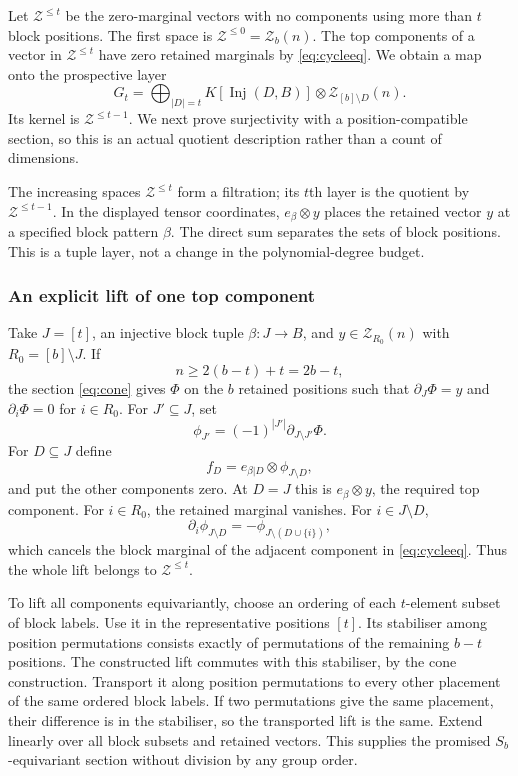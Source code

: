 \documentclass[11pt,a4paper]{article}
\theoremstyle{definition}\newtheorem{definition}[theorem]{Definition}
\theoremstyle{remark}\newtheorem{remark}[theorem]{Remark}
\DeclareMathOperator{\Inj}{Inj}
\begin{document}
Let $\mathcal Z^{\le t}$ be the zero-marginal vectors with no components using more than $t$ block positions. The first space is $\mathcal Z^{\le0}=\mathcal Z_b(n)$. The top components of a vector in $\mathcal Z^{\le t}$ have zero retained marginals by \eqref{eq:cycleeq}. We obtain a map onto the prospective layer
\[G_t=\bigoplus_{|D|=t}K[\Inj(D,B)]\otimes \mathcal Z_{[b]\setminus D}(n).
\]
Its kernel is $\mathcal Z^{\le t-1}$. We next prove surjectivity with a position-compatible section, so this is an actual quotient description rather than a count of dimensions.

The increasing spaces $\mathcal Z^{\le t}$ form a filtration; its
$t$th layer is the quotient by $\mathcal Z^{\le t-1}$. In the
displayed tensor coordinates, $e_\beta\otimes y$ places the retained
vector $y$ at a specified block pattern $\beta$. The direct sum separates
the sets of block positions. This is a tuple layer, not a change in
the polynomial-degree budget.

\subsubsection{An explicit lift of one top component}
Take $J=[t]$, an injective block tuple $\beta:J\to B$, and $y\in \mathcal Z_{R_0}(n)$ with $R_0=[b]\setminus J$. If
\[n\ge2(b-t)+t=2b-t,
\]
the section \eqref{eq:cone} gives $\Phi$ on the $b$ retained positions such that $\partial_J\Phi=y$ and $\partial_i\Phi=0$ for $i\in R_0$. For $J'\subseteq J$, set
\[\phi_{J'}=(-1)^{|J'|}\partial_{J\setminus J'}\Phi.
\]
For $D\subseteq J$ define
\[f_D=e_{\beta|D}\otimes\phi_{J\setminus D},
\]
and put the other components zero. At $D=J$ this is $e_\beta\otimes y$, the required top component. For $i\in R_0$, the retained marginal vanishes. For $i\in J\setminus D$,
\[\partial_i\phi_{J\setminus D}=-\phi_{J\setminus(D\cup\{i\})},
\]
which cancels the block marginal of the adjacent component in \eqref{eq:cycleeq}. Thus the whole lift belongs to $\mathcal Z^{\le t}$.

To lift all components equivariantly, choose an ordering of each $t$-element subset of block labels. Use it in the representative positions $[t]$. Its stabiliser among position permutations consists exactly of permutations of the remaining $b-t$ positions. The constructed lift commutes with this stabiliser, by the cone construction. Transport it along position permutations to every other placement of the same ordered block labels. If two permutations give the same placement, their difference is in the stabiliser, so the transported lift is the same. Extend linearly over all block subsets and retained vectors. This supplies the promised $S_b$-equivariant section without division by any group order.
\end{document}
